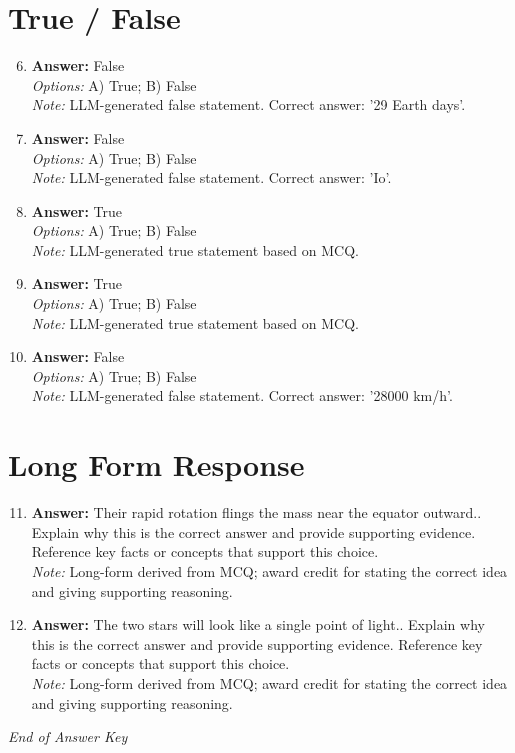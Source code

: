 \documentclass[12pt]{article}
\begin{document}
\section*{True / False}
\begin{enumerate}[label=\arabic*.]
\setcounter{enumi}{5}
\item \textbf{Answer:} False
\\ \textit{Options:} A) True; B) False
\\ \textit{Note:} LLM-generated false statement. Correct answer: '29 Earth days'.
\item \textbf{Answer:} False
\\ \textit{Options:} A) True; B) False
\\ \textit{Note:} LLM-generated false statement. Correct answer: 'Io'.
\item \textbf{Answer:} True
\\ \textit{Options:} A) True; B) False
\\ \textit{Note:} LLM-generated true statement based on MCQ.
\item \textbf{Answer:} True
\\ \textit{Options:} A) True; B) False
\\ \textit{Note:} LLM-generated true statement based on MCQ.
\item \textbf{Answer:} False
\\ \textit{Options:} A) True; B) False
\\ \textit{Note:} LLM-generated false statement. Correct answer: '28000 km/h'.
\end{enumerate}

\section*{Long Form Response}
\begin{enumerate}[label=\arabic*.]
\setcounter{enumi}{10}
\item \textbf{Answer:} Their rapid rotation flings the mass near the equator outward.. Explain why this is the correct answer and provide supporting evidence. Reference key facts or concepts that support this choice.
\\ \textit{Note:} Long-form derived from MCQ; award credit for stating the correct idea and giving supporting reasoning.
\item \textbf{Answer:} The two stars will look like a single point of light.. Explain why this is the correct answer and provide supporting evidence. Reference key facts or concepts that support this choice.
\\ \textit{Note:} Long-form derived from MCQ; award credit for stating the correct idea and giving supporting reasoning.
\end{enumerate}

\vfill
\noindent\textit{End of Answer Key}
\end{document}
